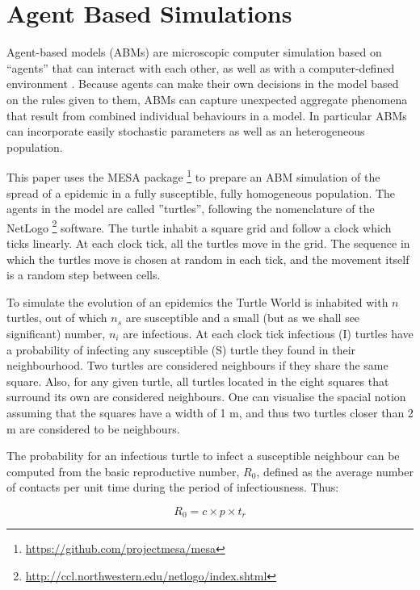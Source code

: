 \documentclass[a4paper,oneside,11pt]{article}
\begin{document}
\section{Agent Based Simulations}
\label{sec:ABM}

Agent-based models (ABMs) are microscopic computer simulation based on ``agents'' that can interact with each other, as well as with a computer-defined environment \cite{Hunter2017}. Because agents can make their own decisions in the model based on the rules given to them, ABMs can capture unexpected aggregate phenomena that result from combined individual behaviours in a model. In particular ABMs can incorporate easily stochastic parameters as well as an heterogeneous population.

This paper uses the MESA package \footnote{\url{https://github.com/projectmesa/mesa}} to prepare an ABM simulation of the spread of a epidemic in a fully susceptible, fully homogeneous population. The agents in the model are called ''turtles'', following the nomenclature of the NetLogo \footnote{\url{http://ccl.northwestern.edu/netlogo/index.shtml}} software. The turtle inhabit a square grid and follow a clock which ticks linearly. At each clock tick, all the turtles move in the grid. The sequence in which the turtles move is chosen at random in each tick, and the movement itself is a random step between cells.

To simulate the evolution of an epidemics the Turtle World is inhabited with $n$ turtles, out of which $n_s$ are susceptible and a small (but as we shall see significant) number, $n_i$ are infectious. At each clock tick infectious (I) turtles have a probability of infecting any susceptible (S) turtle they found in their neighbourhood. Two turtles are considered neighbours if they share the same square. Also, for any given turtle, all turtles located in the eight squares that surround its own are considered neighbours. One can visualise the spacial notion assuming that the squares have a width of 1 m, and thus two turtles closer than 2 m are considered to be neighbours.

The probability for an infectious turtle to infect a susceptible neighbour can be computed from the basic reproductive number, $R_0$, defined as the average number of contacts per unit time during the period of infectiousness. Thus:

\begin{equation}
R_0 = c \times p \times t_r
\end{equation}
\end{document}
